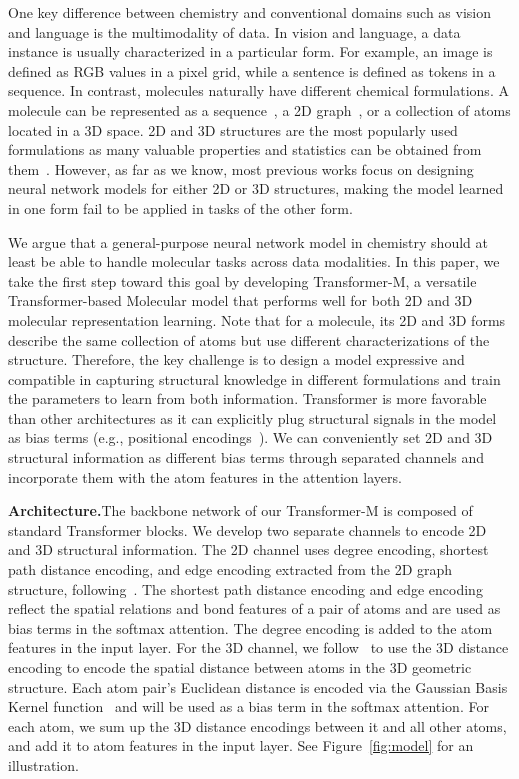 \documentclass{article} \usepackage[dvipsnames]{xcolor}
\begin{document}
One key difference between chemistry and conventional domains such as vision and language is the multimodality of data. In vision and language, a data instance is usually characterized in a particular form. For example, an image is defined as RGB values in a pixel grid, while a sentence is defined as tokens in a sequence. In contrast, molecules naturally have different chemical formulations. A molecule can be represented as a sequence~\citep{weininger1988smiles}, a 2D graph~\citep{wiswesser1985historic}, or a collection of atoms located in a 3D space. 2D and 3D structures are the most popularly used formulations as many valuable properties and statistics can be obtained from them~\citep{chmiela2017machine,stokes2020deep}. However, as far as we know, most previous works focus on designing neural network models for either 2D or 3D structures, making the model learned in one form fail to be applied in tasks of the other form. 

We argue that a general-purpose neural network model in chemistry should at least be able to handle molecular tasks across data modalities. In this paper, we take the first step toward this goal by developing Transformer-M, a versatile Transformer-based Molecular model that performs well for both 2D and 3D molecular representation learning. Note that for a molecule, its 2D and 3D forms describe the same collection of atoms but use different characterizations of the structure. Therefore, the key challenge is to design a model expressive and compatible in capturing structural knowledge in different formulations and train the parameters to learn from both information. Transformer is more favorable than other architectures as it can explicitly plug structural signals in the model as bias terms (e.g., positional encodings~\citep{vaswani2017attention,raffel2019exploring}). We can conveniently set 2D and 3D structural information as different bias terms through separated channels and incorporate them with the atom features in the attention layers. 

\textbf{Architecture.}\quad The backbone network of our Transformer-M is composed of standard Transformer blocks. We develop two separate channels to encode 2D and 3D structural information. The 2D channel uses degree encoding, shortest path distance encoding, and edge encoding extracted from the 2D graph structure, following~\citet{ying2021transformers}. The shortest path distance encoding and edge encoding reflect the spatial relations and bond features of a pair of atoms and are used as bias terms in the softmax attention. The degree encoding is added to the atom features in the input layer. For the 3D channel, we follow~\citet{shi2022benchmarking} to use the 3D distance encoding to encode the spatial distance between atoms in the 3D geometric structure. Each atom pair's Euclidean distance is encoded via the Gaussian Basis Kernel function~\citep{scholkopf1997comparing} and will be used as a bias term in the softmax attention. For each atom, we sum up the 3D distance encodings between it and all other atoms, and add it to atom features in the input layer. See Figure~\ref{fig:model} for an illustration.
\end{document}

